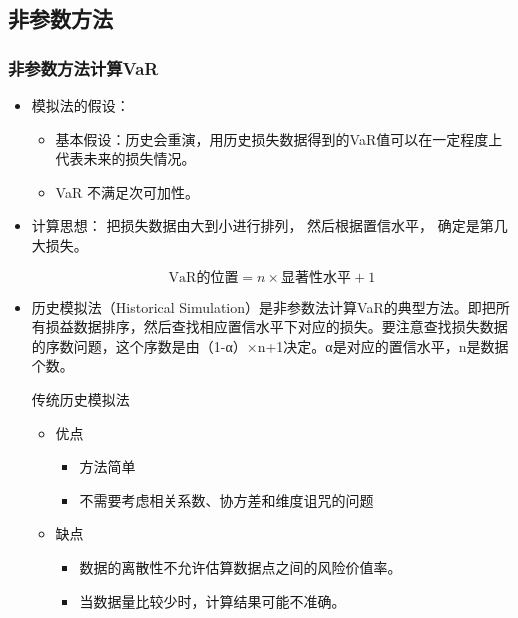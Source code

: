 \subsection{非参数方法}

\subsubsection{非参数方法计算VaR}
   

\begin{itemize}

\item 模拟法的假设：


    \begin{itemize}


    \item 基本假设：历史会重演，用历史损失数据得到的VaR值可以在一定程度上代表未来的损失情况。  
    \item  VaR 不满足次可加性。
    \end{itemize}


\item 计算思想： 把损失数据由大到小进行排列， 然后根据置信水平， 确定是第几大损失。

\[
\text{VaR的位置} = n \times \text{显著性水平} + 1
\]


\item 历史模拟法（Historical Simulation）是非参数法计算VaR的典型方法。即把所有损益数据排序，然后查找相应置信水平下对应的损失。要注意查找损失数据的序数问题，这个序数是由（1-α）×n+1决定。α是对应的置信水平，n是数据个数。




\begin{knowledgebox}{传统历史模拟法}

    

\begin{itemize}
    \item 优点
    \begin{itemize}
    \item 方法简单
    \item 不需要考虑相关系数、协方差和维度诅咒的问题
    \end{itemize}

    \item 缺点
    \begin{itemize}

    \item 数据的离散性不允许估算数据点之间的风险价值率。
    \item 当数据量比较少时，计算结果可能不准确。
    \end{itemize}
\end{itemize}

\end{knowledgebox}




\end{itemize}



